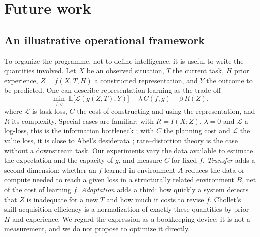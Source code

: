 \documentclass[11pt,a4paper]{article}
\begin{document}
\section{Future work}\label{sec:future}

\subsection{An illustrative operational framework}
To organize the programme, not to define intelligence, it is useful to write
the quantities involved. Let $X$ be an observed situation, $T$ the current
task, $H$ prior experience, $Z=f(X,T,H)$ a constructed representation, and $Y$
the outcome to be predicted. One can describe representation learning as the
trade-off
\begin{equation}
  \min_{f,g}\;\mathbb{E}\big[\mathcal{L}(g(Z,T),Y)\big]
  +\lambda\,C(f,g)+\beta\,R(Z),
\end{equation}
where $\mathcal{L}$ is task loss, $C$ the cost of constructing and using the
representation, and $R$ its complexity. Special cases are familiar: with
$R=I(X;Z)$, $\lambda=0$ and $\mathcal{L}$ a log-loss, this is the information
bottleneck \citep{tishby2000}; with $C$ the planning cost and $\mathcal{L}$ the
value loss, it is close to Abel's desiderata \citep{abel2020}; rate--distortion
theory is the case without a downstream task. Our experiments vary the data
available to estimate the expectation and the capacity of $g$, and measure $C$
for fixed $f$. \emph{Transfer} adds a second dimension: whether an $f$ learned
in environment $A$ reduces the data or compute needed to reach a given loss in
a structurally related environment $B$, net of the cost of learning $f$.
\emph{Adaptation} adds a third: how quickly a system detects that $Z$ is
inadequate for a new $T$ and how much it costs to revise $f$. Chollet's
skill-acquisition efficiency \citep{chollet2019} is a normalization of exactly
these quantities by prior $H$ and experience. We regard the expression as a
bookkeeping device; it is not a measurement, and we do not propose to optimize
it directly.
\end{document}
